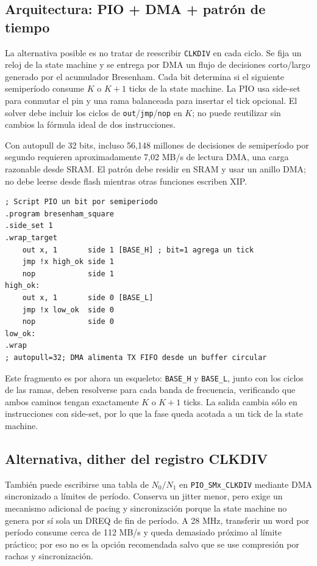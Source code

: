 \documentclass[10pt,a4paper]{article}
\begin{document}
\subsection{Arquitectura: PIO + DMA + patrón de tiempo}
La alternativa posible es no tratar de reescribir \texttt{CLKDIV} en cada ciclo.
Se fija un reloj de la state machine y se entrega por DMA un flujo de
decisiones corto/largo generado por el acumulador Bresenham. Cada bit
determina si el siguiente semiperíodo consume \(K\) o \(K+1\) ticks de la
state machine. La PIO usa side-set para conmutar el pin y una rama balanceada
para insertar el tick opcional. El solver debe incluir los ciclos de
\texttt{out}/\texttt{jmp}/\texttt{nop} en \(K\); no puede reutilizar sin
cambios la fórmula ideal de dos instrucciones.

Con autopull de 32 bits, incluso 56,148 millones de decisiones de
semiperíodo por segundo requieren aproximadamente 7,02 MB/s de lectura DMA,
una carga razonable desde SRAM. El patrón debe residir en SRAM y usar un
anillo DMA; no debe leerse desde flash mientras otras funciones escriben XIP.

\begin{lstlisting}[style=code]
; Script PIO un bit por semiperiodo
.program bresenham_square
.side_set 1
.wrap_target
    out x, 1       side 1 [BASE_H] ; bit=1 agrega un tick
    jmp !x high_ok side 1
    nop            side 1
high_ok:
    out x, 1       side 0 [BASE_L]
    jmp !x low_ok  side 0
    nop            side 0
low_ok:
.wrap
; autopull=32; DMA alimenta TX FIFO desde un buffer circular
\end{lstlisting}

Este fragmento es por ahora un esqueleto: \texttt{BASE\_H} y
\texttt{BASE\_L}, junto con los ciclos de las ramas, deben resolverse para
cada banda de frecuencia, verificando que ambos caminos tengan exactamente
\(K\) o \(K+1\) ticks. La salida cambia sólo en instrucciones con side-set,
por lo que la fase queda acotada a un tick de la state machine.

\subsection{Alternativa, dither del registro CLKDIV}
También puede escribirse una tabla de \(N_0/N_1\) en
\texttt{PIO\_SMx\_CLKDIV} mediante DMA sincronizado a límites de período.
Conserva un jitter menor, pero exige un mecanismo adicional de pacing y
sincronización porque la state machine no genera por sí sola un DREQ de fin
de período. A 28 MHz, transferir un word por período consume cerca de
112 MB/s y queda demasiado próximo al límite práctico; por eso no es la
opción recomendada salvo que se use compresión por rachas y sincronización.
\end{document}
